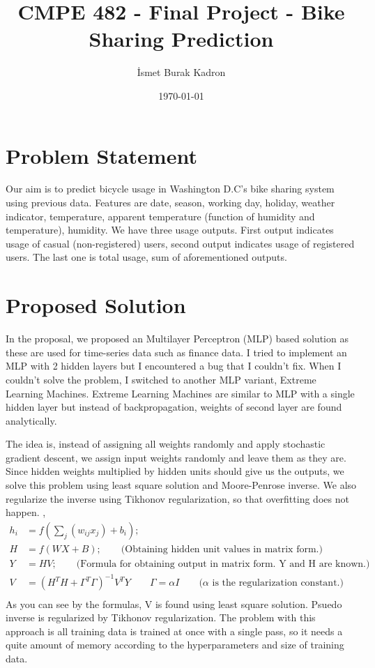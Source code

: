 \documentclass[11pt]{article} %
\title{CMPE 482 - Final Project - Bike Sharing Prediction}
\author{İsmet Burak Kadron}
\date{\today} %
\begin{document}
\maketitle

\section{Problem Statement}
Our aim is to predict bicycle usage in Washington D.C's bike sharing system using previous data. Features are date, season, working day, holiday, weather indicator, temperature, apparent temperature (function of humidity and temperature), humidity. We have three usage outputs. First output indicates usage of casual (non-registered) users, second output indicates usage of registered users. The last one is total usage, sum of aforementioned outputs.

\section{Proposed Solution}
In the proposal, we proposed an Multilayer Perceptron (MLP) based solution as these are used for time-series data such as finance data. I tried to implement an MLP with 2 hidden layers but I encountered a bug that I couldn't fix. When I couldn't solve the problem, I switched to another MLP variant, Extreme Learning Machines. Extreme Learning Machines are similar to MLP with a single hidden layer but instead of backpropagation, weights of second layer are found analytically.

 The idea is, instead of assigning all weights randomly and apply stochastic gradient descent, we assign input weights randomly and leave them as they are. Since hidden weights multiplied by hidden units should give us the outputs, we solve this problem using least square solution and Moore-Penrose inverse. We also regularize the inverse using Tikhonov regularization, so that overfitting does not happen. \cite{huang2004extreme},\cite{huang2012extreme}
\[ 
\begin{aligned}
h_{i} &= f(\sum_{j}(w_{ij}x_{j}) + b_{i}); \\
H &= f(WX + B); \qquad \text{(Obtaining hidden unit values in matrix form.)} \\
Y &= HV; \qquad \text{(Formula for obtaining output in matrix form. Y and H are known.)} \\
V &= (H^{T}H+ \Gamma^{T} \Gamma )^{-1}V^{T}Y \qquad \Gamma = \alpha I \qquad \text{($\alpha$ is the regularization constant.)}\\
\end{aligned}
\]
As you can see by the formulas, V is found using least square solution. Psuedo inverse is regularized by Tikhonov regularization. The problem with this approach is all training data is trained at once with a single pass, so it needs a quite amount of memory according to the hyperparameters and size of training data.
\end{document}
